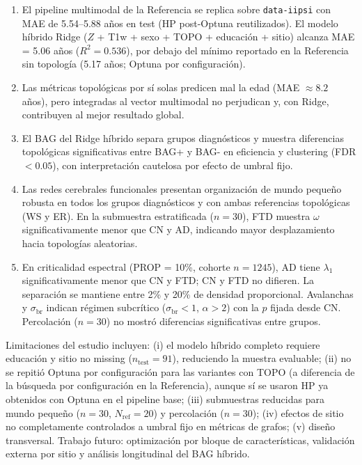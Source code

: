 \documentclass[12pt,a4paper]{article}
\begin{document}
\begin{enumerate}

  \item El pipeline multimodal de la Referencia se replica sobre \texttt{data-iipsi} con MAE
  de 5.54--5.88 años en test (HP post-Optuna reutilizados). El modelo híbrido Ridge ($Z$ + T1w + sexo + TOPO +
  educación + sitio) alcanza MAE = 5.06 años ($R^2 = 0.536$), por debajo del mínimo
  reportado en la Referencia sin topología (5.17 años; Optuna por configuración).

  \item Las métricas topológicas por sí solas predicen mal la edad (MAE $\approx 8.2$ años), pero
  integradas al vector multimodal no perjudican y, con Ridge, contribuyen al mejor resultado global.

  \item El BAG del Ridge híbrido separa grupos diagnósticos y muestra diferencias topológicas
  significativas entre BAG+ y BAG- en eficiencia y clustering (FDR $< 0.05$), con interpretación
  cautelosa por efecto de umbral fijo.

  \item Las redes cerebrales funcionales presentan organización de mundo pequeño robusta en
  todos los grupos diagnósticos y con ambas referencias topológicas (WS y ER). En la submuestra
  estratificada ($n = 30$), FTD muestra $\omega$ significativamente menor que CN y AD, indicando
  mayor desplazamiento hacia topologías aleatorias.

  \item En criticalidad espectral (PROP = 10\%, cohorte $n = 1245$), AD tiene $\lambda_1$
  significativamente menor que CN y FTD; CN y FTD no difieren. La separación se mantiene entre
  2\% y 20\% de densidad proporcional. Avalanchas y $\sigma_{\text{br}}$ indican régimen
  subcrítico ($\sigma_{\text{br}} < 1$, $\alpha > 2$) con la $p$ fijada desde CN. Percolación
  ($n = 30$) no mostró diferencias significativas entre grupos.

\end{enumerate}

Limitaciones del estudio incluyen: (i) el modelo híbrido completo requiere educación y sitio
no missing ($n_{\text{test}} = 91$), reduciendo la muestra evaluable; (ii) no se repitió Optuna por
configuración para las variantes con TOPO (a diferencia de la búsqueda por configuración en la
Referencia), aunque
sí se usaron HP ya obtenidos con Optuna en el pipeline base; (iii) submuestras reducidas para
mundo pequeño ($n = 30$, $N_{\text{ref}} = 20$) y percolación ($n = 30$); (iv) efectos de sitio
no completamente controlados a umbral fijo en métricas de grafos; (v) diseño transversal. Trabajo futuro:
optimización por bloque de características, validación externa por sitio y análisis longitudinal
del BAG híbrido.
\end{document}
